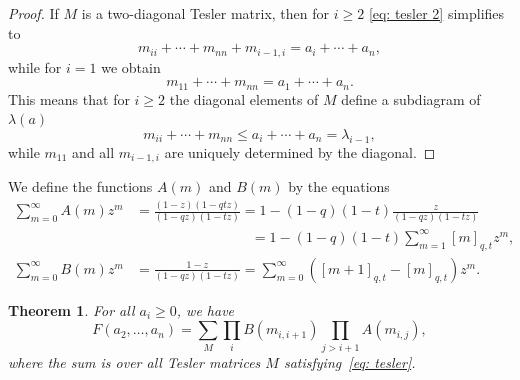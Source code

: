 \documentclass[11pt,reqno]{amsart}
\newtheorem{theorem}{Theorem}[section]
\theoremstyle{definition}
\numberwithin{equation}{section}
\begin{document}
\begin{proof}
If $M$ is a two-diagonal Tesler matrix, then for $i\geqslant 2$ \eqref{eq: tesler 2} simplifies to
\[
	m_{ii}+\cdots+m_{nn}+m_{i-1,i}=a_i+\cdots+a_n,
\]
while for $i=1$ we obtain
\[
    m_{11}+\cdots+m_{nn}=a_1+\cdots+a_n.
\]
This means that for  $i\geqslant 2$ the diagonal elements of $M$ define a subdiagram of $\lambda(a)$
\[
	m_{ii}+\cdots+m_{nn}\leqslant a_i+\cdots+a_n=\lambda_{i-1},
\]
while $m_{11}$ and all $m_{i-1,i}$ are uniquely determined by the diagonal. 
\end{proof}

 We define the functions $A(m)$ and $B(m)$ by the equations
\begin{equation*}
\begin{split}
	\sum_{m=0}^{\infty}A(m)z^m &= \frac{(1-z)(1-qtz)}{(1-qz)(1-tz)}=1-(1-q)(1-t)\frac{z}{(1-qz)(1-tz)}\\
	& \qquad \qquad \qquad \qquad \; = 1-(1-q)(1-t)\sum_{m=1}^{\infty}[m]_{q,t}z^m,\\
	\sum_{m=0}^{\infty}B(m)z^m &= \frac{1-z}{(1-qz)(1-tz)}=\sum_{m=0}^{\infty}([m+1]_{q,t}-[m]_{q,t})z^m.
\end{split}
\end{equation*}

\begin{theorem}
For all $a_i\geqslant 0$, we have
\begin{equation}
\label{eq:tesler big sum}
	F(a_2,\ldots,a_n)=\sum_{M} \prod_{i}B(m_{i,i+1})\prod_{j>i+1}A(m_{i,j}), 
\end{equation}
where the sum is over all Tesler matrices $M$ satisfying~\eqref{eq: tesler}.
\end{theorem}
\end{document}
